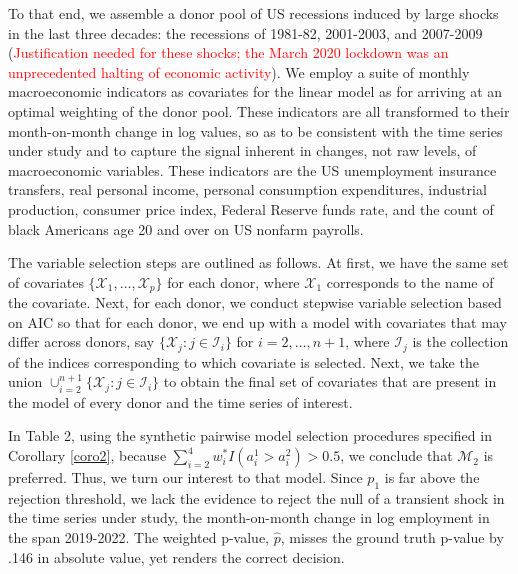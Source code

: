 \documentclass[11pt]{article}
\def\mc#1{\mathcal{#1}} %
\def\mc#1{\mathcal{#1}}
\theoremstyle{definition}
\begin{document}
To that end, we assemble a donor pool of US recessions induced by large shocks in the last three decades: the recessions of 1981-82, 2001-2003, and 2007-2009 (\textcolor{red}{Justification needed for these shocks; the March 2020 lockdown was an unprecedented halting of economic activity}).  We employ a suite of monthly macroeconomic indicators as covariates for the linear model as for arriving at an optimal weighting of the donor pool.  These indicators are all transformed to their month-on-month change in log values, so as to be consistent with the time series under study and to capture the signal inherent in changes, not raw levels, of macroeconomic variables.  These indicators are the US unemployment insurance transfers, real personal income, personal consumption expenditures, industrial production, consumer price index, Federal Reserve funds rate, and the count of black Americans age 20 and over on US nonfarm payrolls.


The variable selection steps are outlined as follows. At first, we have the same set of covariates $\{\mc{X}_1, \ldots, \mc{X}_p\}$ for each donor, where $\mc{X}_1$ corresponds to the name of the covariate. Next, for each donor, we conduct stepwise variable selection based on AIC so that for each donor, we end up with a model with covariates that may differ across  donors, say $\{\mc{X}_j \colon j\in \mc{I}_i\}$ for $i = 2, \ldots, n+1$, where $\mc{I}_j$ is the collection of the indices corresponding to which covariate is selected. Next, we  take the union $\cup_{i=2}^{n+1}\{\mc{X}_j \colon j\in \mc{I}_i\}$ to obtain the final set of covariates that are present in the model of every donor and the time series of interest.

In Table 2, using the synthetic pairwise model selection procedures specified in Corollary \ref{coro2}, because $\sum_{i=2}^4 w_i^* I(a_i^1 > a_i^2)>0.5$,  we conclude that  $\mc{M}_2$ is preferred. Thus, we turn our interest to that model.  Since $p_{1}$ is far above the rejection threshold, we lack the evidence to reject the null of a transient shock in the time series under study, the month-on-month change in log employment in the span 2019-2022.  The weighted p-value, $\hat p $, misses the ground truth p-value by .146 in absolute value, yet renders the correct decision.
\end{document}
